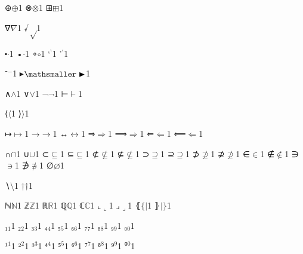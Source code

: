{{⊕}{{\ensuremath{\oplus}}}1
{⊗}{{\ensuremath{\otimes}}}1
{⊞}{{\ensuremath{\boxplus}}}1

{∇}{{\ensuremath{\nabla}}}1
{√}{{\ensuremath{\sqrt}}}1

{⬝}{{\ensuremath{\cdot}}}1
{•}{{\ensuremath{\cdot}}}1
{∘}{{\ensuremath{\circ}}}1
{`}{{\ensuremath{{}^\backprime}}}1
{'}{{\ensuremath{{}^\prime}}}1

{⁻}{{\ensuremath{^{-}}}}1
{▸}{{\ensuremath{\mathsmaller\blacktriangleright}}}1 %

{∧}{{\ensuremath{\wedge}}}1
{∨}{{\ensuremath{\vee}}}1
{¬}{{\ensuremath{\neg}}}1
{⊢}{{\ensuremath{\vdash}}}1

{⟨}{{\ensuremath{\langle}}}1
{⟩}{{\ensuremath{\rangle}}}1

{↦}{{\ensuremath{\mapsto}}}1
{→}{{\ensuremath{\rightarrow}}}1
{↔}{{\ensuremath{\leftrightarrow}}}1
{⇒}{{\ensuremath{\Rightarrow}}}1
{⟹}{{\ensuremath{\Longrightarrow}}}1
{⇐}{{\ensuremath{\Leftarrow}}}1
{⟸}{{\ensuremath{\Longleftarrow}}}1

{∩}{{\ensuremath{\cap}}}1
{∪}{{\ensuremath{\cup}}}1
{⊂}{{\ensuremath{\subseteq}}}1
{⊆}{{\ensuremath{\subseteq}}}1
{⊄}{{\ensuremath{\nsubseteq}}}1
{⊈}{{\ensuremath{\nsubseteq}}}1
{⊃}{{\ensuremath{\supseteq}}}1
{⊇}{{\ensuremath{\supseteq}}}1
{⊅}{{\ensuremath{\nsupseteq}}}1
{⊉}{{\ensuremath{\nsupseteq}}}1
{∈}{{\ensuremath{\in}}}1
{∉}{{\ensuremath{\notin}}}1
{∋}{{\ensuremath{\ni}}}1
{∌}{{\ensuremath{\notni}}}1
{∅}{{\ensuremath{\varnothing}}}1

{∖}{{\ensuremath{\setminus}}}1
{†}{{\ensuremath{\dag}}}1

{ℕ}{{\ensuremath{\mathbb{N}}}}1
{ℤ}{{\ensuremath{\mathbb{Z}}}}1
{ℝ}{{\ensuremath{\mathbb{R}}}}1
{ℚ}{{\ensuremath{\mathbb{Q}}}}1
{ℂ}{{\ensuremath{\mathbb{C}}}}1
{⌞}{{\ensuremath{\llcorner}}}1
{⌟}{{\ensuremath{\lrcorner}}}1
{⦃}{{\ensuremath{\{\!|}}}1
{⦄}{{\ensuremath{|\!\}}}}1

{₁}{{\ensuremath{_1}}}1
{₂}{{\ensuremath{_2}}}1
{₃}{{\ensuremath{_3}}}1
{₄}{{\ensuremath{_4}}}1
{₅}{{\ensuremath{_5}}}1
{₆}{{\ensuremath{_6}}}1
{₇}{{\ensuremath{_7}}}1
{₈}{{\ensuremath{_8}}}1
{₉}{{\ensuremath{_9}}}1
{₀}{{\ensuremath{_0}}}1

{¹}{{\ensuremath{^1}}}1
{²}{{\ensuremath{^2}}}1
{³}{{\ensuremath{^3}}}1
{⁴}{{\ensuremath{^4}}}1
{⁵}{{\ensuremath{^5}}}1
{⁶}{{\ensuremath{^6}}}1
{⁷}{{\ensuremath{^7}}}1
{⁸}{{\ensuremath{^8}}}1
{⁹}{{\ensuremath{^9}}}1
{⁰}{{\ensuremath{^0}}}1


}
